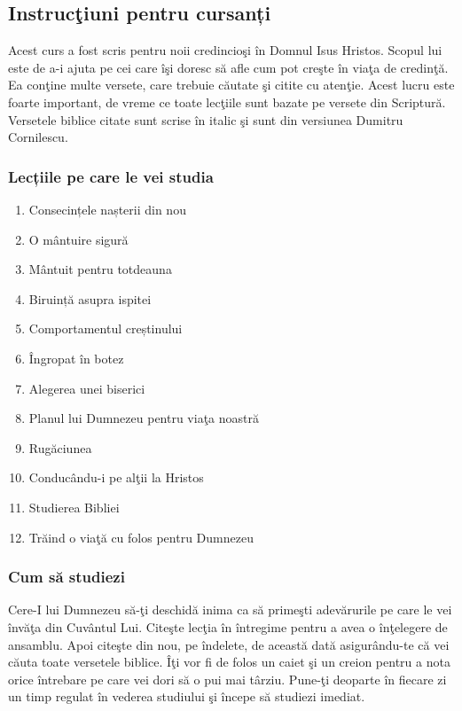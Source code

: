 
\subsection*{Instrucţiuni pentru cursanți}

Acest curs a fost scris pentru noii credincioşi în Domnul Isus Hristos. Scopul lui este de a-i ajuta pe cei care îşi doresc să afle cum pot creşte în viaţa de credinţă. Ea conţine multe versete, care trebuie căutate şi citite cu atenţie. Acest lucru este foarte important, de vreme ce toate lecţiile sunt bazate pe versete din Scriptură. Versetele biblice citate sunt scrise în italic şi sunt din versiunea Dumitru Cornilescu.

\subsubsection*{Lecțiile pe care le vei studia}

\begin{enumerate}
\itemsep0em 
	\item Consecințele nașterii din nou
	\item O mântuire sigură
	\item Mântuit pentru totdeauna
	\item Biruință asupra ispitei
	\item Comportamentul creștinului
	\item Îngropat în botez
	\item Alegerea unei biserici
	\item Planul lui Dumnezeu pentru viaţa noastră
	\item Rugăciunea
	\item Conducându-i pe alţii la Hristos
	\item Studierea Bibliei
	\item Trăind o viaţă cu folos pentru Dumnezeu
\end{enumerate}


\subsubsection*{Cum să studiezi}

Cere-I lui Dumnezeu să-ţi deschidă inima ca să primeşti adevărurile pe care le vei învăţa din Cuvântul Lui. Citeşte lecţia în întregime pentru a avea o înţelegere de ansamblu. Apoi citeşte din nou, pe îndelete, de această dată asigurându-te că vei căuta toate versetele biblice. Îţi vor fi de folos un caiet şi un creion pentru a nota orice întrebare pe care vei dori să o pui mai târziu. Pune-ţi deoparte în fiecare zi un timp regulat în vederea studiului şi începe să studiezi imediat.

